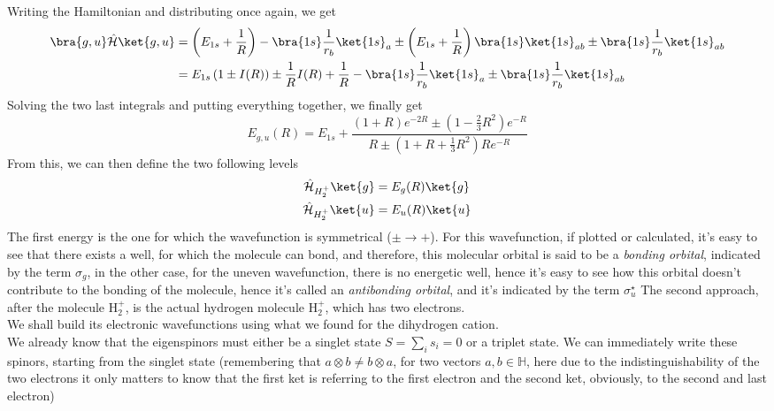 \documentclass[a4paper, 11pt]{book}
\newcommand{\1}{\opr{\mathds{1}}}
\newcommand{\ham}{\mathcal{H}}
\newcommand{\opr}[1]{\hat{#1}}
\theoremstyle{plain}
\begin{document}
	Writing the Hamiltonian and distributing once again, we get
	\begin{equation}
		\begin{aligned}
			\bra{g,u}\opr{\ham}\ket{g,u}&=\left( E_{1s}+\frac{1}{R} \right)-\bra{1s}\frac{1}{r_b}\ket{1s}_a\pm\left( E_{1s}+\frac{1}{R} \right)\bra{1s}\ket{1s}_{ab}\pm\bra{1s}\frac{1}{r_b}\ket{1s}_{ab}\\
			&=E_{1s}\left( 1\pm I(R) \right)\pm\frac{1}{R}I(R)+\frac{1}{R}-\bra{1s}\frac{1}{r_b}\ket{1s}_a\pm\bra{1s}\frac{1}{r_b}\ket{1s}_{ab}
		\end{aligned}
		\label{eq:numeratorh2pluscalc}
	\end{equation}
	Solving the two last integrals and putting everything together, we finally get
	\begin{equation}
	E_{g,u}(R)=E_{1s}+\frac{(1+R)e^{-2R}\pm\left( 1-\frac{2}{3}R^2 \right)e^{-R}}{R\pm\left( 1+R+\frac{1}{3}R^2 \right)Re^{-R}}
		\label{eq:h2plusenergy}
	\end{equation}
	From this, we can then define the two following levels
	\begin{equation*}
		\begin{aligned}
			\opr{\ham}_{H_2^+}\ket{g}&=E_g(R)\ket{g}\\
			\opr{\ham}_{H_2^+}\ket{u}&=E_u(R)\ket{u}
		\end{aligned}
	\end{equation*}
	The first energy is the one for which the wavefunction is symmetrical ($\pm\to+$). For this wavefunction, if plotted or calculated, it's easy to see that there exists a well, for which the molecule can bond, and therefore, this molecular orbital is said to be a \textit{bonding orbital}, indicated by the term $\sigma_g$, in the other case, for the uneven wavefunction, there is no energetic well, hence it's easy to see how this orbital doesn't contribute to the bonding of the molecule, hence it's called an \textit{antibonding orbital}, and it's indicated by the term $\sigma_u^\star$
	The second approach, after the molecule $\mathrm{H}_2^+$, is the actual hydrogen molecule $\mathrm{H}_2^+$, which has two electrons.\\
	We shall build its electronic wavefunctions using what we found for the dihydrogen cation.\\
	We already know that the eigenspinors must either be a singlet state $S=\sum_is_i=0$ or a triplet state. We can immediately write these spinors, starting from the singlet state (remembering that $a\otimes b\ne b\otimes a$, for two vectors $a,b\in\mathbb{H}$, here due to the indistinguishability of the two electrons it only matters to know that the first ket is referring to the first electron and the second ket, obviously, to the second and last electron)
\end{document}

